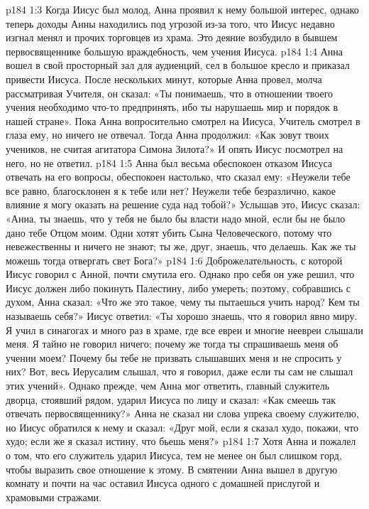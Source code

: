 \vs p184 1:3 Когда Иисус был молод, Анна проявил к нему большой интерес, однако теперь доходы Анны находились под угрозой из\hyp{}за того, что Иисус недавно изгнал менял и прочих торговцев из храма. Это деяние возбудило в бывшем первосвященнике большую враждебность, чем учения Иисуса.
\vs p184 1:4 Анна вошел в свой просторный зал для аудиенций, сел в большое кресло и приказал привести Иисуса. После нескольких минут, которые Анна провел, молча рассматривая Учителя, он сказал: «Ты понимаешь, что в отношении твоего учения необходимо что\hyp{}то предпринять, ибо ты нарушаешь мир и порядок в нашей стране». Пока Анна вопросительно смотрел на Иисуса, Учитель смотрел в глаза ему, но ничего не отвечал. Тогда Анна продолжил: «Как зовут твоих учеников, не считая агитатора Симона Зилота?» И опять Иисус посмотрел на него, но не ответил.
\vs p184 1:5 Анна был весьма обеспокоен отказом Иисуса отвечать на его вопросы, обеспокоен настолько, что сказал ему: «Неужели тебе все равно, благосклонен я к тебе или нет? Неужели тебе безразлично, какое влияние я могу оказать на решение суда над тобой?» Услышав это, Иисус сказал: «Анна, ты знаешь, что у тебя не было бы власти надо мной, если бы не было дано тебе Отцом моим. Одни хотят убить Сына Человеческого, потому что невежественны и ничего не знают; ты же, друг, знаешь, что делаешь. Как же ты можешь тогда отвергать свет Бога?»
\vs p184 1:6 Доброжелательность, с которой Иисус говорил с Анной, почти смутила его. Однако про себя он уже решил, что Иисус должен либо покинуть Палестину, либо умереть; поэтому, собравшись с духом, Анна сказал: «Что же это такое, чему ты пытаешься учить народ? Кем ты называешь себя?» Иисус ответил: «Ты хорошо знаешь, что я говорил явно миру. Я учил в синагогах и много раз в храме, где все евреи и многие неевреи слышали меня. Я тайно не говорил ничего; почему же тогда ты спрашиваешь меня об учении моем? Почему бы тебе не призвать слышавших меня и не спросить у них? Вот, весь Иерусалим слышал, что я говорил, даже если ты сам не слышал этих учений». Однако прежде, чем Анна мог ответить, главный служитель дворца, стоявший рядом, ударил Иисуса по лицу и сказал: «Как смеешь так отвечать первосвященнику?» Анна не сказал ни слова упрека своему служителю, но Иисус обратился к нему и сказал: «Друг мой, если я сказал худо, покажи, что худо; если же я сказал истину, что бьешь меня?»
\vs p184 1:7 Хотя Анна и пожалел о том, что его служитель ударил Иисуса, тем не менее он был слишком горд, чтобы выразить свое отношение к этому. В смятении Анна вышел в другую комнату и почти на час оставил Иисуса одного с домашней прислугой и храмовыми стражами.
